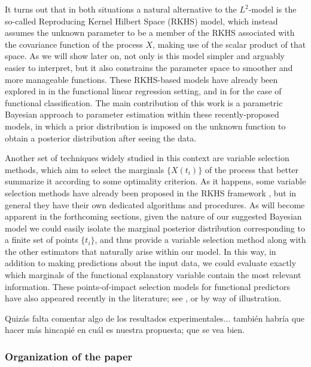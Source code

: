 \documentclass[ba]{imsart}
\numberwithin{equation}{section}
\theoremstyle{plain}
\newenvironment{comment}
{
\noindent \em \color{red}
}
{
\color{black}
}
\begin{document}
It turns out that in both situations a natural alternative to the \(L^2\)-model is the so-called Reproducing Kernel Hilbert Space (RKHS) model, which instead assumes the unknown parameter to be a member of the RKHS associated with the covariance function of the process \(X\), making use of the scalar product of that space. As we will show later on, not only is this model simpler and arguably easier to interpret, but it also constrains the parameter space to smoother and more manageable functions. These RKHS-based models have already been explored in \citet{berrendero2020general} in the functional linear regression setting, and in \citet{berrendero2018use} for the case of functional classification. The main contribution of this work is a parametric Bayesian approach to parameter estimation within these recently-proposed models, in which a prior distribution is imposed on the unknown function to  obtain a posterior distribution after seeing the data.

Another set of techniques widely studied in this context are variable selection methods, which aim to select the marginals \(\{X(t_i)\}\) of the process that better summarize it according to some optimality criterion. As it happens, some variable selection methods have already been proposed in the RKHS framework \citep[see for example][]{berrendero2019rkhs}, but in general they have their own dedicated algorithms and procedures. As will become apparent in the forthcoming sections, given the nature of our suggested Bayesian model we could easily isolate the marginal posterior distribution corresponding to a finite set of points \(\{t_i\}\), and thus provide a variable selection method along with the other estimators that naturally arise within our model. In this way, in addition to making predictions about the input data, we could evaluate exactly which marginals of the functional explanatory variable contain the most relevant information. These points-of-impact selection models for functional predictors have also appeared recently in the literature; see \citet{poss2020superconsistent}, \citet{berrendero2016variable} or \citet{ferraty2010most} by way of illustration.

\begin{comment}
  Quizás falta comentar algo de los resultados experimentales... también habría que hacer más hincapié en cuál es nuestra propuesta; que se vea bien.
\end{comment}

\subsubsection{Organization of the paper}
\end{document}
